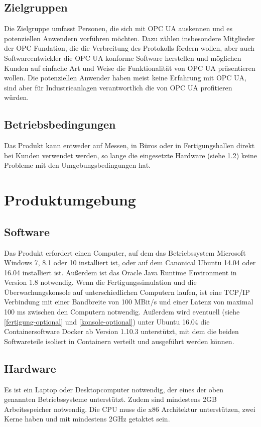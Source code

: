 \documentclass[parskip=full]{scrartcl}
\begin{document}
\subsection{Zielgruppen}
Die Zielgruppe umfasst Personen, die sich mit OPC UA auskennen und es potenziellen Anwendern vorführen möchten.
Dazu zählen insbesondere Mitglieder der OPC Fundation, die die Verbreitung des Protokolls fördern wollen,
aber auch Softwareentwickler die OPC UA konforme Software herstellen und möglichen Kunden auf einfache Art und
Weise die Funktionalität von OPC UA präsentieren wollen.
Die potenziellen Anwender haben meist keine Erfahrung mit OPC UA, sind aber für Industrieanlagen verantwortlich
die von OPC UA profitieren würden.

\subsection{Betriebsbedingungen}
Das Produkt kann entweder auf Messen, in Büros oder in Fertigungshallen direkt bei Kunden verwendet werden,
so lange die eingesetzte Hardware (siehe \ref{Hardware}) keine Probleme mit den Umgebungsbedingungen hat.

\section{Produktumgebung}
\subsection{Software}
Das Produkt erfordert einen Computer, auf dem das Betriebssystem Microsoft Windows 7, 8.1 oder 10 installiert ist,
oder auf dem Canonical Ubuntu 14.04 oder 16.04 installiert ist. Außerdem ist das Oracle Java Runtime Environment in Version 1.8
notwendig. Wenn die Fertigungssimulation und die Überwachungskonsole auf unterschiedlichen Computern laufen,
ist eine TCP/IP Verbindung mit einer Bandbreite von 100 MBit/s und einer Latenz von maximal 100 ms zwischen den Computern notwendig.
Außerdem wird eventuell (siehe \ref{fertigung-optional} und \ref{konsole-optional}) unter Ubuntu 16.04 die Containersoftware Docker
ab Version 1.10.3 unterstützt, mit dem die beiden Softwareteile isoliert in Containern verteilt und ausgeführt werden können.

\subsection{Hardware}
\label{Hardware}
Es ist ein Laptop oder Desktopcomputer notwendig, der eines der oben genannten Betriebssysteme unterstützt.
Zudem sind mindestens 2GB Arbeitsspeicher notwendig. Die CPU muss die x86 Architektur unterstützen, zwei Kerne haben und mit
mindestens 2GHz getaktet sein.
\end{document}
